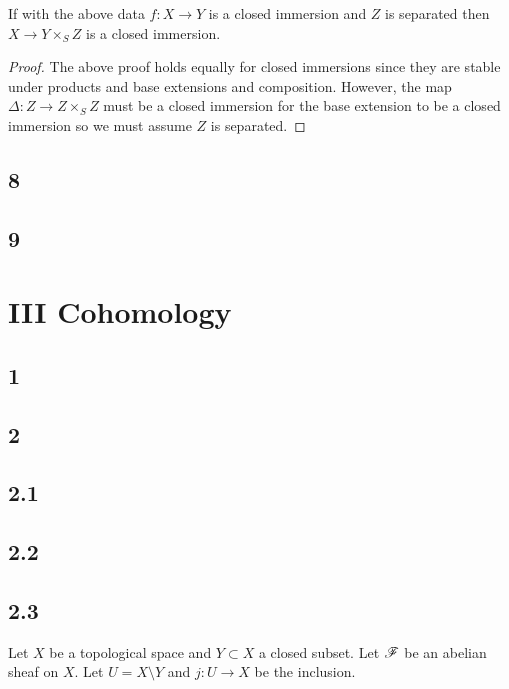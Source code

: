 \documentclass[12pt]{article}
\begin{document}
\begin{corollary}
If with the above data $f : X \to Y$ is a closed immersion and $Z$ is separated then $X \to Y \times_S Z$ is a closed immersion.
\end{corollary}

\begin{proof}
The above proof holds equally for closed immersions since they are stable under products and base extensions and composition. However, the map $\Delta : Z \to Z \times_S Z$ must be a closed immersion for the base extension to be a closed immersion so we must assume $Z$ is separated. 
\end{proof}

\subsection{8}

\subsection{9}

\section{III Cohomology}

\subsection{1}


\subsection{2}

\subsection{2.1}

\subsection{2.2}

\subsection{2.3}

Let $X$ be a topological space and $Y \subset X$ a closed subset. Let $\mathscr{F}$ be an abelian sheaf on $X$. Let $U = X \setminus Y$ and $j : U \to X$ be the inclusion.
\end{document}
